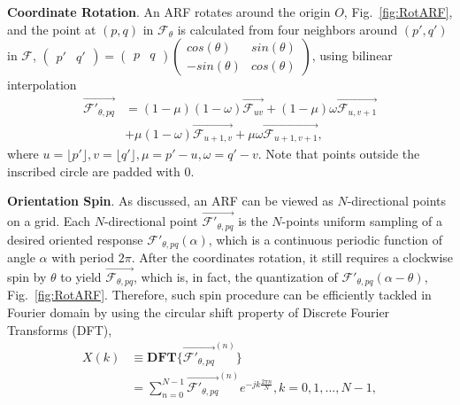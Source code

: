\documentclass[10pt,twocolumn,letterpaper]{article}
\begin{document}
    \textbf{Coordinate Rotation}.
        An ARF rotates around the origin $O$, Fig.~\ref{fig:RotARF}, and the point at $(p,q)$ in $\mathcal{F}_{\theta}$ is calculated from four neighbors around $(p',q')$ in $\mathcal{F}$,
        $\left(\begin{smallmatrix}p'&q'\end{smallmatrix}\right)=\left(\begin{smallmatrix}p&q\end{smallmatrix}\right)
        \left(\begin{smallmatrix}cos(\theta)&sin(\theta)\\-sin(\theta)&cos(\theta)\end{smallmatrix}\right)$,
        using bilinear interpolation
        \begin{equation}
            \begin{aligned}
                \overrightarrow{\mathcal{F'}_{\theta, pq}} &= (1-\mu)(1-\omega)\overrightarrow{\mathcal{F}_{uv}} +
                (1-\mu)\omega\overrightarrow{\mathcal{F}_{u,v+1}} \\
                &+ \mu(1-\omega)\overrightarrow{\mathcal{F}_{u+1,v}} + \mu\omega\overrightarrow{\mathcal{F}_{u+1,v+1}},
            \end{aligned}
        \label{eq:Interpolation}
        \end{equation}
        where  $u=\lfloor p' \rfloor, v=\lfloor q' \rfloor, \mu = p'-u, \omega = q'-v$.
        Note that points outside the inscribed circle are padded with 0.

    \textbf{Orientation Spin}.
        As discussed, an ARF can be viewed as $N$-directional points on a grid. Each $N$-directional point $\overrightarrow{\mathcal{F'}_{\theta, pq}}$ is the $N$-points uniform sampling of a desired oriented response $\mathcal{F'}_{\theta, pq}(\alpha)$, which is a continuous periodic function of angle $\alpha$ with period $2\pi$.
        After the coordinates rotation, it still requires a clockwise spin by $\theta$ to yield $\overrightarrow{\mathcal{F}_{\theta, pq}}$, which is, in fact, the quantization of $\mathcal{F'}_{\theta, pq}(\alpha-\theta)$, {Fig.~\ref{fig:RotARF}}. Therefore, such spin procedure can be efficiently tackled in Fourier domain by using the circular shift property of Discrete Fourier Transforms (DFT),
        \begin{equation}
            \begin{aligned}
                X(k) &\equiv \mathbf{DFT}\{\overrightarrow{\mathcal{F'}_{\theta, pq}}^{(n)}\} \\
                    &= \sum_{n=0}^{N-1} \overrightarrow{\mathcal{F'}_{\theta, pq}}^{(n)} e^{-j k \frac{2\pi n}{N}},
                    {\scriptstyle k=0,1,...,N-1}, \\
            \end{aligned}
        \label{eq:Spin}
        \end{equation}
\end{document}
